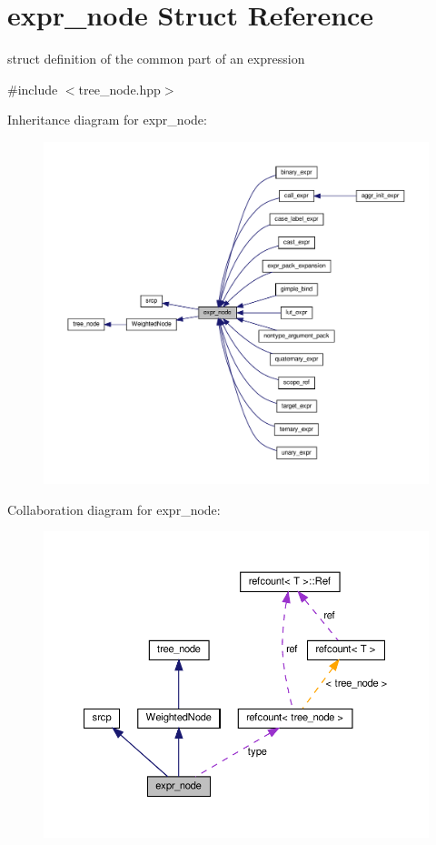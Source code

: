 \hypertarget{structexpr__node}{}\section{expr\+\_\+node Struct Reference}
\label{structexpr__node}


struct definition of the common part of an expression  




{\ttfamily \#include $<$tree\+\_\+node.\+hpp$>$}



Inheritance diagram for expr\+\_\+node\+:
\nopagebreak
\begin{figure}[H]
\begin{center}
\leavevmode
\includegraphics[width=350pt]{d3/dc4/structexpr__node__inherit__graph}
\end{center}
\end{figure}


Collaboration diagram for expr\+\_\+node\+:
\nopagebreak
\begin{figure}[H]
\begin{center}
\leavevmode
\includegraphics[width=350pt]{d9/d49/structexpr__node__coll__graph}
\end{center}
\end{figure}
